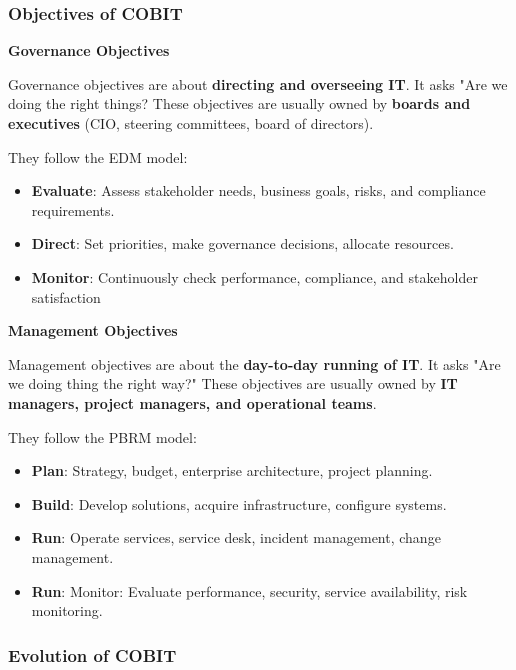 \subsubsection{Objectives of COBIT}

\noindent\textbf{Governance Objectives}

Governance objectives are about \textbf{directing and overseeing IT}. It asks "Are we doing the right things? These objectives are usually owned by \textbf{boards and executives} (CIO, steering committees, board of directors).

They follow the EDM model:

\begin{itemize}
    \item \textbf{Evaluate}: Assess stakeholder needs, business goals, risks, and compliance requirements.
    \item \textbf{Direct}: Set priorities, make governance decisions, allocate resources.
    \item \textbf{Monitor}: Continuously check performance, compliance, and stakeholder satisfaction
\end{itemize}

\bigskip

\noindent\textbf{Management Objectives}

Management objectives are about the \textbf{day-to-day running of IT}. It asks "Are we doing thing the right way?" These objectives are usually owned by \textbf{IT managers, project managers, and operational teams}.

They follow the PBRM model:

\begin{itemize}
    \item \textbf{Plan}: Strategy, budget, enterprise architecture, project planning.
    \item \textbf{Build}: Develop solutions, acquire infrastructure, configure systems.
    \item \textbf{Run}: Operate services, service desk, incident management, change management.
    \item \textbf{Run}: Monitor: Evaluate performance, security, service availability, risk monitoring.
\end{itemize}

\subsubsection{Evolution of COBIT}


